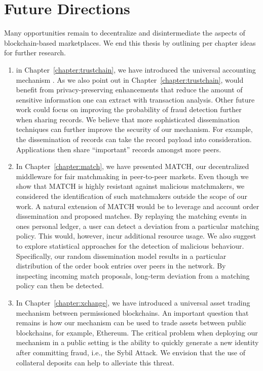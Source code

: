 \section{Future Directions}
Many opportunities remain to decentralize and disintermediate the aspects of blockchain-based marketplaces.
We end this thesis by outlining per chapter ideas for further research.

\begin{enumerate}
	\item in Chapter~\ref{chapter:trustchain}, we have introduced the universal accounting mechanism \TrustChain{}.
	As we also point out in Chapter~\ref{chapter:trustchain}, \TrustChain{} would benefit from privacy-preserving enhancements that reduce the amount of sensitive information one can extract with transaction analysis.
	Other future work could focus on improving the probability of fraud detection further when sharing records.
	We believe that more sophisticated dissemination techniques can further improve the security of our mechanism.
	For example, the dissemination of records can take the record payload into consideration.
	Applications then share \enquote{important} records amongst more peers.
	
	\item In Chapter~\ref{chapter:match}, we have presented MATCH, our decentralized middleware for fair matchmaking in peer-to-peer markets.
	Even though we show that MATCH is highly resistant against malicious matchmakers, we considered the identification of such matchmakers outside the scope of our work.
	A natural extension of MATCH would be to leverage \TrustChain and account order dissemination and proposed matches.
	By replaying the matching events in ones personal ledger, a user can detect a deviation from a particular matching policy.
	This would, however, incur additional resource usage.
	We also suggest to explore statistical approaches for the detection of malicious behaviour.
	Specifically, our random dissemination model results in a particular distribution of the order book entries over peers in the network.
	By inspecting incoming match proposals, long-term deviation from a matching policy can then be detected.
	
	\item In Chapter~\ref{chapter:xchange}, we have introduced a universal asset trading mechanism between permissioned blockchains.
	An important question that remains is how our mechanism can be used to trade assets between public blockchains, for example, Ethereum.
	The critical problem when deploying our mechanism in a public setting is the ability to quickly generate a new identity after committing fraud, i.e., the Sybil Attack.
	We envision that the use of collateral deposits can help to alleviate this threat.
	

\end{enumerate}

